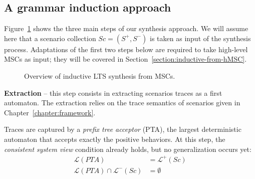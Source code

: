 
\subsection{A grammar induction approach\label{subsection:inductive-synthesis-approach}}

Figure~\ref{image:inductive-synthesis-overview} shows the three main steps of our synthesis approach. We will assume here that a scenario collection $Sc = (S^+, S^-)$ is taken as input of the synthesis process. Adaptations of the first two steps below are required to take high-level MSCs as input; they will be covered in Section~\ref{section:inductive-from-hMSC}.

\begin{figure}\centering
  \caption{Overview of inductive LTS synthesis from MSCs.\label{image:inductive-synthesis-overview}}
\end{figure}

\noindent \textbf{Extraction} -- this step consists in extracting scenarios traces as a first automaton. The extraction relies on the trace semantics of scenarios given in Chapter~\ref{chapter:framework}. 

Traces are captured by a \emph{prefix tree acceptor} (PTA), the largest deterministic automaton that accepts exactly the positive behaviors. At this step, the \emph{consistent system view} condition already holds, but no generalization occurs yet:
\begin{align*}
\mathcal{L}(PTA) &= \mathcal{L}^+(Sc)\\
\mathcal{L}(PTA) \cap \mathcal{L}^-(Sc) &= \emptyset
\end{align*}

